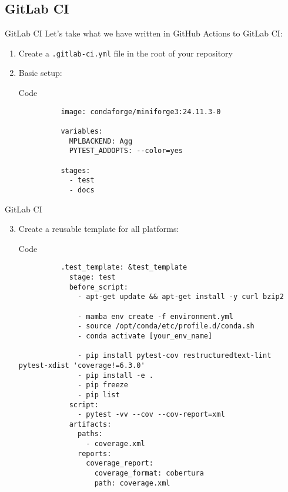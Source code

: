 \subsection{GitLab CI}
\begin{frame}[fragile]{
    GitLab CI
    \hfill
  }
  Let's take what we have written in GitHub Actions to GitLab CI:
  \begin{enumerate}
    \item Create a \texttt{.gitlab-ci.yml} file in the root of your repository
    \item Basic setup:
      \begin{block}{Code}
        \begin{verbatim}
          image: condaforge/miniforge3:24.11.3-0

          variables:
            MPLBACKEND: Agg
            PYTEST_ADDOPTS: --color=yes

          stages:
            - test
            - docs
        \end{verbatim}
      \end{block}
  \end{enumerate}
\end{frame}

\begin{frame}[fragile]{GitLab CI}
  \begin{enumerate}
    \setcounter{enumi}{2}
    \item Create a reusable template for all platforms:
      \begin{block}{Code}
        \footnotesize
        \begin{verbatim}
          .test_template: &test_template
            stage: test
            before_script:
              - apt-get update && apt-get install -y curl bzip2

              - mamba env create -f environment.yml
              - source /opt/conda/etc/profile.d/conda.sh
              - conda activate [your_env_name]

              - pip install pytest-cov restructuredtext-lint pytest-xdist 'coverage!=6.3.0'
              - pip install -e .
              - pip freeze
              - pip list
            script:
              - pytest -vv --cov --cov-report=xml
            artifacts:
              paths:
                - coverage.xml
              reports:
                coverage_report:
                  coverage_format: cobertura
                  path: coverage.xml
        \end{verbatim}
      \end{block}
  \end{enumerate}
\end{frame}

